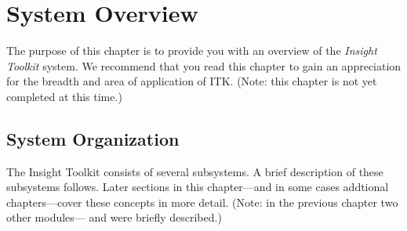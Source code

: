 \chapter{System Overview}
\label{chapter:SystemOverview}

The purpose of this chapter is to provide you with an overview of the
\emph{Insight Toolkit} system. We recommend that you read this chapter to
gain an appreciation for the breadth and area of application of ITK.
(Note: this chapter is not yet completed at this time.)

\section{System Organization}
\label{sec:SystemOrganization}

The Insight Toolkit consists of several subsystems. A brief
description of these subsystems follows. Later sections in this chapter---and
in some cases addtional chapters---cover these concepts in more detail. (Note:
in the previous chapter two other modules--- and
 were briefly described.)


